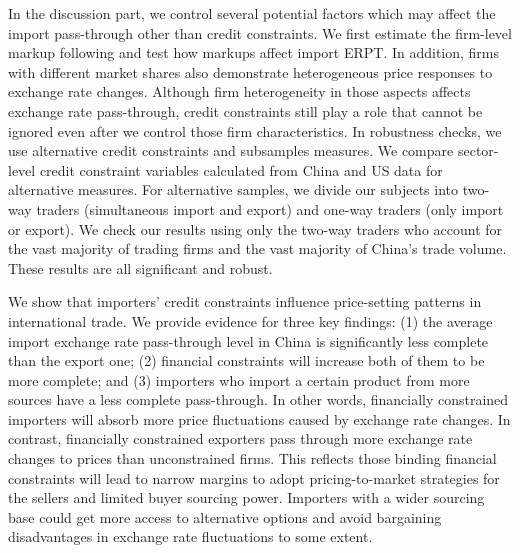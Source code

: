 \documentclass[12pt]{article}
\begin{document}
In the discussion part, we control several potential factors which may affect the import pass-through other than credit constraints. We first estimate the firm-level markup following \cite{dlw2012} and test how markups affect import ERPT. In addition, firms with different market shares also demonstrate heterogeneous price responses to exchange rate changes. Although firm heterogeneity in those aspects affects exchange rate pass-through, credit constraints still play a role that cannot be ignored even after we control those firm characteristics. In robustness checks, we use alternative credit constraints and subsamples measures. We compare sector-level credit constraint variables calculated from China and US data for alternative measures. For alternative samples, we divide our subjects into two-way traders (simultaneous import and export) and one-way traders (only import or export). We check our results using only the two-way traders who account for the vast majority of trading firms and the vast majority of China's trade volume. These results are all significant and robust.

We show that importers' credit constraints influence price-setting patterns in international trade. We provide evidence for three key findings: (1) the average import exchange rate pass-through level in China is significantly less complete than the export one; (2) financial constraints will increase both of them to be more complete; and (3) importers who import a certain product from more sources have a less complete pass-through. In other words, financially constrained importers will absorb more price fluctuations caused by exchange rate changes. In contrast, financially constrained exporters pass through more exchange rate changes to prices than unconstrained firms. This reflects those binding financial constraints will lead to narrow margins to adopt pricing-to-market strategies for the sellers and limited buyer sourcing power. Importers with a wider sourcing base could get more access to alternative options and avoid bargaining disadvantages in exchange rate fluctuations to some extent.
\end{document}
